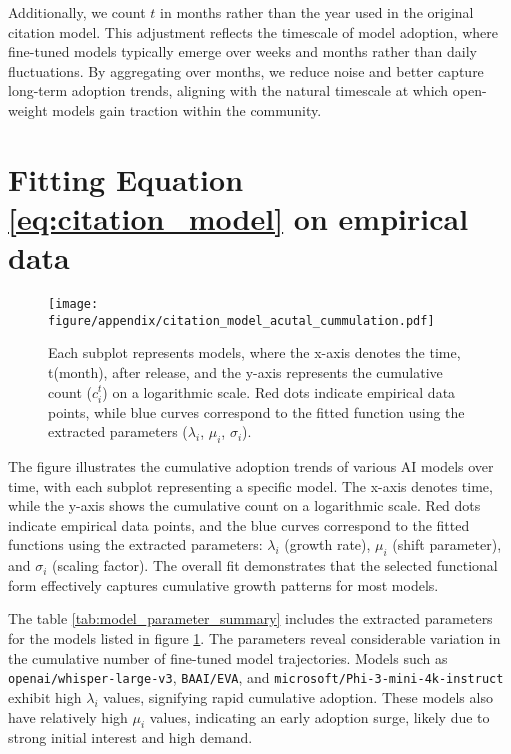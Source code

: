 \documentclass{article} %
\begin{document}
Additionally, we count $ t $ in months rather than the year used in the original citation model. This adjustment reflects the timescale of model adoption, where fine-tuned models typically emerge over weeks and months rather than daily fluctuations. By aggregating over months, we reduce noise and better capture long-term adoption trends, aligning with the natural timescale at which open-weight models gain traction within the community.

\section{Fitting Equation \ref{eq:citation_model} on empirical data}
\begin{figure}[ht]
    \begin{center}
        \texttt{[image: figure/appendix/citation\_model\_acutal\_cummulation.pdf]}
    \end{center}
    \caption{Each subplot represents models, where the x-axis denotes the time, t(month), after release, and the y-axis represents the cumulative count ($c_i^t$) on a logarithmic scale. Red dots indicate empirical data points, while blue curves correspond to the fitted function using the extracted parameters ($\lambda_i$, $\mu_i$, $\sigma_i$).}
    \label{fig:top_50_most_finetuned}
\end{figure}
The figure illustrates the cumulative adoption trends of various AI models over time, with each subplot representing a specific model. The x-axis denotes time, while the y-axis shows the cumulative count on a logarithmic scale. Red dots indicate empirical data points, and the blue curves correspond to the fitted functions using the extracted parameters: $\lambda_i$ (growth rate), $\mu_i$ (shift parameter), and $\sigma_i$ (scaling factor). The overall fit demonstrates that the selected functional form effectively captures cumulative growth patterns for most models.

The table \ref{tab:model_parameter_summary} includes the extracted parameters for the models listed in figure \ref{fig:top_50_most_finetuned}. The parameters reveal considerable variation in the cumulative number of fine-tuned model trajectories. Models such as \texttt{openai/whisper-large-v3}, \texttt{BAAI/EVA}, and \texttt{microsoft/Phi-3-mini-4k-instruct} exhibit high $\lambda_i$ values, signifying rapid cumulative adoption. These models also have relatively high $\mu_i$ values, indicating an early adoption surge, likely due to strong initial interest and high demand. 
\end{document}

